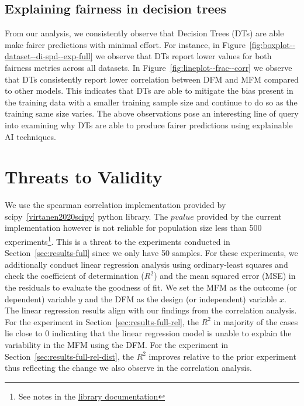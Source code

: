 \documentclass{article}
\begin{document}
\subsection{Explaining fairness in decision trees}\label{sec:discuss-explain-fair-dt}

From our analysis, we consistently observe that Decision Trees (DTs)
are able make fairer predictions with minimal effort. For instance, in
Figure \ref{fig:boxplot--dataset--di-spd--exp-full} we observe that
DTs report lower values for both fairness metrics across all datasets.
In Figure \ref{fig:lineplot--frac--corr} we observe that DTs
consistently report lower correlation between DFM and MFM compared to
other models. This indicates that DTs are able to mitigate the bias
present in the training data with a smaller training sample size and
continue to do so as the training same size varies. The above
observations pose an interesting line of query into examining why DTs
are able to produce fairer predictions using explainable AI
techniques.

\section{Threats to Validity}\label{sec:threats}

We use the spearman correlation implementation provided by
scipy \ref{virtanen2020scipy} python library. The $pvalue$ provided by
the current implementation however is not reliable for population size
less than 500 experiments\footnote{See notes in the
\href{https://docs.scipy.org/doc/scipy/reference/generated/scipy.stats.spearmanr.html}{library
  documentation}}. This is a threat to the experiments conducted in
Section \ref{sec:results-full} since we only have 50 samples. For
these experiments, we additionally conduct linear regression analysis
using ordinary-least squares and check the coefficient of
determination ($R^2$) and the mean squared error (MSE) in the
residuals to evaluate the goodness of fit. We set the MFM as the
outcome (or dependent) variable $y$ and the DFM as the design (or
independent) variable $x$. The linear regression results align with
our findings from the correlation analysis. For the experiment in
Section \ref{sec:results-full-rel}, the $R^2$ in majority of the cases
lie close to 0 indicating that the linear regression model is unable
to explain the variability in the MFM using the DFM. For the
experiment in Section \ref{sec:results-full-rel-dist}, the $R^2$
improves relative to the prior experiment thus reflecting the change
we also observe in the correlation analysis.
\end{document}
